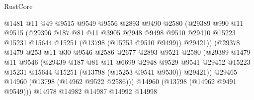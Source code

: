 \begin{lexlean}{RustCore}
\begin{coremodule}
                            @1481
                            @11
                            @49
                            @9515
                            @9549
                            @9556
                            @2893
                            @9490
                            @2580
                            (@29389
                              @990
                              @11
                              @9515
                              (@29396
                                @187
                                @81
                                @11
                                @3905
                                @2948
                                @9498
                                @9510
                                @29410
                                @15223
                                @15231
                                @15644
                                @15251
                                (@13798 (@15253 @9510 @9499))
                                @29421))
                            (@29378
                              @1479
                              @253
                              @11
                              @30
                              @9546
                              @2586
                              @2677
                              @2893
                              @9521
                              @2580
                              (@29389
                                @1479
                                @11
                                @9546
                                (@29439
                                  @187
                                  @81
                                  @11
                                  @6699
                                  @2948
                                  @9529
                                  @9541
                                  @29452
                                  @15223
                                  @15231
                                  @15644
                                  @15251
                                  (@13798 (@15253 @9541 @9530))
                                  @29421))
                              @29465
                              @14960
                              (@13798 (@14962 @9522 @2586)))
                            @14960
                            (@13798 (@14962 @9491 @9549)))
                          @14978
                          @14982
                          @14987
                          @14992
                          @14998

\end{coremodule}
\end{lexlean}
